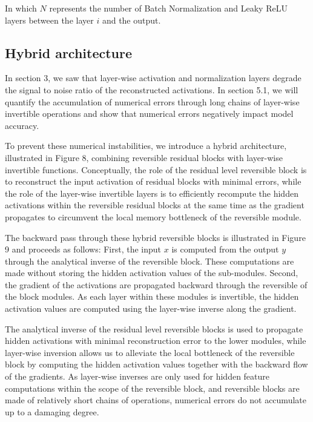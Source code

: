 \documentclass[twocolumn]{bmcart}
\begin{document}
In which $N$ represents the number of Batch Normalization and Leaky ReLU layers between the layer $i$ and the output.

\subsection{Hybrid architecture}

In section 3, we saw that layer-wise activation and normalization layers degrade the signal to noise ratio of the reconstructed activations.
In section 5.1, we will quantify the accumulation of numerical errors through long chains of layer-wise invertible operations
and show that numerical errors negatively impact model accuracy.

To prevent these numerical instabilities, we introduce a hybrid architecture, illustrated in Figure 8,
combining reversible residual blocks with layer-wise invertible functions.
Conceptually, the role of the residual level reversible block is to reconstruct the input activation of residual blocks with minimal errors,
while the role of the layer-wise invertible layers is to efficiently recompute the hidden activations within the reversible residual
blocks at the same time as the gradient propagates to circumvent the local memory bottleneck of the reversible module.

The backward pass through these hybrid reversible blocks is illustrated in Figure 9 and proceeds as follows:
First, the input $x$ is computed from the output $y$ through the analytical inverse of the reversible block.
These computations are made without storing the hidden activation values of the sub-modules.
Second, the gradient of the activations are propagated backward through the reversible of the block modules.
As each layer within these modules is invertible, the hidden activation values
are computed using the layer-wise inverse along the gradient.

The analytical inverse of the residual level reversible blocks is used to propagate hidden activations with minimal reconstruction error to the lower modules,
while layer-wise inversion allows us to alleviate the local bottleneck of the reversible block
by computing the hidden activation values together with the backward flow of the gradients.
As layer-wise inverses are only used for hidden feature computations within the scope of the reversible block,
and reversible blocks are made of relatively short chains of operations,
numerical errors do not accumulate up to a damaging degree.
\end{document}
